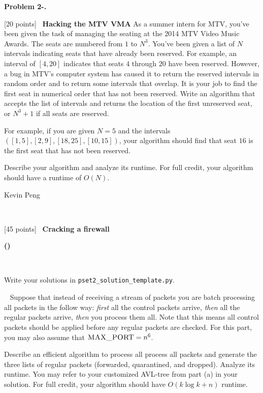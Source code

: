 \documentclass[12pt,twoside]{article}
\makeatletter
\newcommand{\points}[1]{[#1 points]\ }
\newcounter{problemnum}
\newcommand{\theproblem}{Problem \theproblemsetnum-\arabic{problemnum}}
\newenvironment{problems}{
        \begin{list}{{\bf \theproblem. \hspace*{0.5em}}}
        {\setlength{\leftmargin}{0em}
         \setlength{\rightmargin}{0em}
         \setlength{\labelwidth}{0em}
         \setlength{\labelsep}{0em}
         \usecounter{problemnum}}}{\end{list}}
\newcommand{\problem}[1][{}]{\item \let\@currentlabel=\theproblem \textbf{#1}}
\newcounter{problempartnum}[problemnum]
\newenvironment{problemparts}{
        \begin{list}{{\bf (\alph{problempartnum})}}
        {\setlength{\leftmargin}{2.5em}
         \setlength{\rightmargin}{2.5em}
         \setlength{\labelsep}{0.5em}}}{\end{list}}
\newcommand{\problempart}{\addtocounter{problempartnum}{1}\item}
\newcommand{\theproblemsetnum}{2}
\newcommand{\yourname}{Kevin Peng}
\makeatother
\begin{document}
\begin{problems}
\problem \points{20} \textbf{Hacking the MTV VMA}
As a summer intern for MTV, you've been given the task of managing the seating at the 2014 MTV Video Music Awards. The seats are numbered from $1$ to $N^3$. You've been given a list of $N$ intervals indicating seats that have already been reserved. For example, an interval of $[4, 20]$ indicates that seats $4$ through $20$ have been reserved. However, a bug in MTV's computer system has caused it to return the reserved intervals in random order and to return some intervals that overlap. It is your job to find the first seat in numerical order that has not been reserved. Write an algorithm that accepts the list of intervals and returns the location of the first unreserved seat, or $N^3+1$ if all seats are reserved.

For example, if you are given $N=5$ and the intervals $([1, 5], [2, 9], [18, 25], [10, 15])$, your algorithm should find that seat $16$ is the first seat that has not been reserved.

Describe your algorithm and analyze its runtime. For full credit, your algorithm should have a runtime of $O(N)$.


\newpage
\begin{large} \yourname \end{large} \\

\problem \points{45} \textbf{Cracking a firewall}
\begin{problemparts}
\problempart \points{30}

Write your solutions in \texttt{pset2\_solution\_template.py}.

\problempart \points{15}
Suppose that instead of receiving a stream of packets you are batch processing all packets in the follow way: \textit{first} all the control packets arrive, \textit{then} all the regular packets arrive, \textit{then} you process them all. Note that this means all control packets should be applied before any regular packets are checked. For this part, you may also assume that $\textsc{MAX\_PORT}=n^6$.

Describe an efficient algorithm to process all process all packets and generate the three lists of regular packets (forwarded, quarantined, and dropped). Analyze its runtime. You may refer to your customized AVL-tree from part (a) in your solution. For full credit, your algorithm should have $O(k\log{k} + n)$ runtime.


\end{problemparts}

\end{problems}
\end{document}
